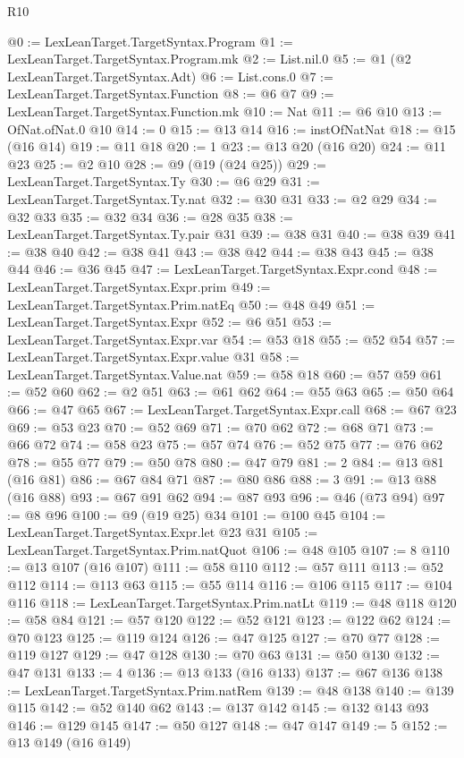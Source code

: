 \begin{lexlean}{R10}
\begin{coremodule}
@0 := LexLeanTarget.TargetSyntax.Program
@1 := LexLeanTarget.TargetSyntax.Program.mk
@2 := List.nil.{0}
@5 := @1 (@2 LexLeanTarget.TargetSyntax.Adt)
@6 := List.cons.{0}
@7 := LexLeanTarget.TargetSyntax.Function
@8 := @6 @7
@9 := LexLeanTarget.TargetSyntax.Function.mk
@10 := Nat
@11 := @6 @10
@13 := OfNat.ofNat.{0} @10
@14 := 0
@15 := @13 @14
@16 := instOfNatNat
@18 := @15 (@16 @14)
@19 := @11 @18
@20 := 1
@23 := @13 @20 (@16 @20)
@24 := @11 @23
@25 := @2 @10
@28 := @9 (@19 (@24 @25))
@29 := LexLeanTarget.TargetSyntax.Ty
@30 := @6 @29
@31 := LexLeanTarget.TargetSyntax.Ty.nat
@32 := @30 @31
@33 := @2 @29
@34 := @32 @33
@35 := @32 @34
@36 := @28 @35
@38 := LexLeanTarget.TargetSyntax.Ty.pair @31
@39 := @38 @31
@40 := @38 @39
@41 := @38 @40
@42 := @38 @41
@43 := @38 @42
@44 := @38 @43
@45 := @38 @44
@46 := @36 @45
@47 := LexLeanTarget.TargetSyntax.Expr.cond
@48 := LexLeanTarget.TargetSyntax.Expr.prim
@49 := LexLeanTarget.TargetSyntax.Prim.natEq
@50 := @48 @49
@51 := LexLeanTarget.TargetSyntax.Expr
@52 := @6 @51
@53 := LexLeanTarget.TargetSyntax.Expr.var
@54 := @53 @18
@55 := @52 @54
@57 := LexLeanTarget.TargetSyntax.Expr.value @31
@58 := LexLeanTarget.TargetSyntax.Value.nat
@59 := @58 @18
@60 := @57 @59
@61 := @52 @60
@62 := @2 @51
@63 := @61 @62
@64 := @55 @63
@65 := @50 @64
@66 := @47 @65
@67 := LexLeanTarget.TargetSyntax.Expr.call
@68 := @67 @23
@69 := @53 @23
@70 := @52 @69
@71 := @70 @62
@72 := @68 @71
@73 := @66 @72
@74 := @58 @23
@75 := @57 @74
@76 := @52 @75
@77 := @76 @62
@78 := @55 @77
@79 := @50 @78
@80 := @47 @79
@81 := 2
@84 := @13 @81 (@16 @81)
@86 := @67 @84 @71
@87 := @80 @86
@88 := 3
@91 := @13 @88 (@16 @88)
@93 := @67 @91 @62
@94 := @87 @93
@96 := @46 (@73 @94)
@97 := @8 @96
@100 := @9 (@19 @25) @34
@101 := @100 @45
@104 := LexLeanTarget.TargetSyntax.Expr.let @23 @31
@105 := LexLeanTarget.TargetSyntax.Prim.natQuot
@106 := @48 @105
@107 := 8
@110 := @13 @107 (@16 @107)
@111 := @58 @110
@112 := @57 @111
@113 := @52 @112
@114 := @113 @63
@115 := @55 @114
@116 := @106 @115
@117 := @104 @116
@118 := LexLeanTarget.TargetSyntax.Prim.natLt
@119 := @48 @118
@120 := @58 @84
@121 := @57 @120
@122 := @52 @121
@123 := @122 @62
@124 := @70 @123
@125 := @119 @124
@126 := @47 @125
@127 := @70 @77
@128 := @119 @127
@129 := @47 @128
@130 := @70 @63
@131 := @50 @130
@132 := @47 @131
@133 := 4
@136 := @13 @133 (@16 @133)
@137 := @67 @136
@138 := LexLeanTarget.TargetSyntax.Prim.natRem
@139 := @48 @138
@140 := @139 @115
@142 := @52 @140 @62
@143 := @137 @142
@145 := @132 @143 @93
@146 := @129 @145
@147 := @50 @127
@148 := @47 @147
@149 := 5
@152 := @13 @149 (@16 @149)

\end{coremodule}
\end{lexlean}
